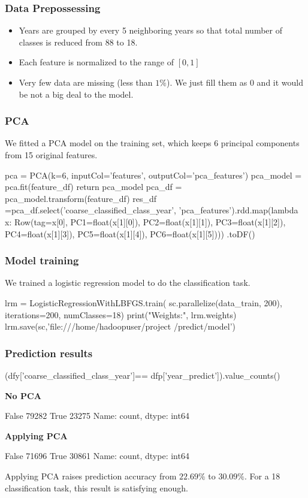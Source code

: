 \documentclass{beamer}
\begin{document}
\begin{frame}[fragile]
\frametitle{Data Prepossessing}

\begin{itemize}
    \item Years are grouped by every 5 neighboring years so that total number of classes is reduced from 88 to 18.
    \item Each feature is normalized to the range of $[0,1]$
    \item Very few data are missing (less than $1\%$). We just fill them as 0 and it would be not a big deal to the model.
\end{itemize}


\end{frame}
\begin{frame}[fragile]
\frametitle{PCA}
We fitted a PCA model on the training set, which keeps 6 principal components from 15 original features.
\begin{mycode}
pca = PCA(k=6, inputCol='features', outputCol='pca_features')
pca_model = pca.fit(feature_df)
return pca_model
pca_df = pca_model.transform(feature_df)
res_df =pca_df.select('coarse_classified_class_year',
'pca_features').rdd.map(lambda x: Row(tag=x[0],
PC1=float(x[1][0]), PC2=float(x[1][1]),
PC3=float(x[1][2]), PC4=float(x[1][3]),
PC5=float(x[1][4]), PC6=float(x[1][5])))
.toDF()
\end{mycode}
    
\end{frame}
\begin{frame}[fragile]
\frametitle{Model training}
We trained a logistic regression model to do the classification task.
\begin{mycode}
lrm = LogisticRegressionWithLBFGS.train(
sc.parallelize(data_train, 200), iterations=200, 
numClasses=18)
print("Weights:", lrm.weights)
lrm.save(sc,'file:///home/hadoopuser/project
             /predict/model')
\end{mycode}
\end{frame}
\begin{frame}[fragile]
\frametitle{Prediction results}
\begin{mycode}
(dfy['coarse_classified_class_year']==
 dfp['year_predict']).value_counts()
\end{mycode}
\begin{minipage}{0.49\linewidth}
\textbf{No PCA}
\begin{bashcode}
False    79282
True     23275
Name: count, 
dtype: int64
\end{bashcode}
\end{minipage}
\begin{minipage}{0.49\linewidth}
\textbf{Applying PCA}
\begin{bashcode}
False    71696
True     30861
Name: count, 
dtype: int64
\end{bashcode}
\end{minipage}

\vspace{0.2cm}

Applying PCA raises prediction accuracy from $22.69\%$ to $30.09\%$. For a 18 classification task, this result is satisfying enough.
\end{frame}
\end{document}
